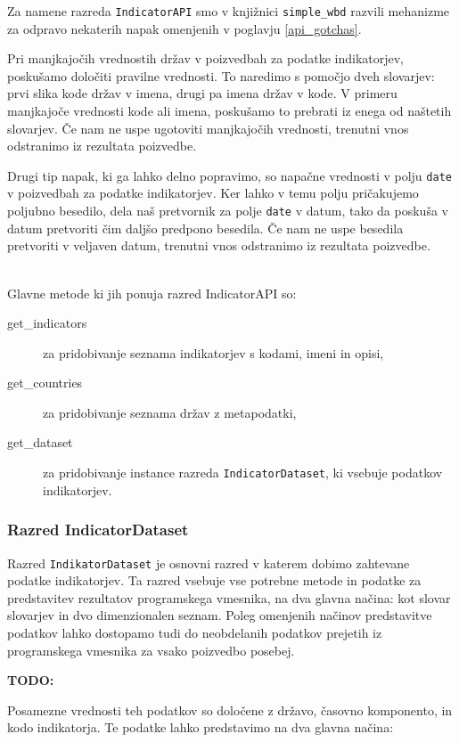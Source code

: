 Za namene razreda \verb|IndicatorAPI| smo v knjižnici \verb|simple_wbd|
razvili mehanizme za odpravo nekaterih napak omenjenih v poglavju 
\ref{api_gotchas}.

Pri manjkajočih vrednostih držav v poizvedbah za podatke indikatorjev,
poskušamo določiti pravilne vrednosti. To naredimo s pomočjo dveh
slovarjev: prvi slika kode držav v imena, drugi pa imena držav v kode. V
primeru manjkajoče vrednosti kode ali imena, poskušamo to prebrati iz enega
od naštetih slovarjev. Če nam ne uspe ugotoviti manjkajočih vrednosti,
trenutni vnos odstranimo iz rezultata poizvedbe.

Drugi tip napak, ki ga lahko delno popravimo, so napačne vrednosti v polju
\verb|date| v poizvedbah za podatke indikatorjev. Ker lahko v temu polju
pričakujemo poljubno besedilo, dela naš pretvornik za polje \verb|date| v 
datum, tako da poskuša v datum pretvoriti čim daljšo predpono besedila.
Če nam ne uspe besedila pretvoriti v veljaven datum, trenutni vnos odstranimo
iz rezultata poizvedbe.


\ \\
Glavne metode ki jih ponuja razred IndicatorAPI so:

\begin{description}  
\item [get\_indicators] za pridobivanje seznama indikatorjev s kodami, imeni
      in opisi,
\item [get\_countries] za pridobivanje seznama držav z metapodatki,
\item [get\_dataset] za pridobivanje instance razreda \verb|IndicatorDataset|,
      ki vsebuje podatkov indikatorjev.
\end{description}


\subsubsection{Razred IndicatorDataset}

Razred \verb|IndikatorDataset| je osnovni razred v katerem dobimo zahtevane podatke
indikatorjev. Ta razred vsebuje vse potrebne metode in podatke za predstavitev
rezultatov programskega vmesnika, na dva glavna načina: kot slovar slovarjev in
dvo dimenzionalen seznam. Poleg omenjenih načinov predstavitve podatkov lahko
dostopamo tudi do neobdelanih podatkov prejetih iz programskega vmesnika za
vsako poizvedbo posebej.

\textbf{TODO:}

Posamezne vrednosti teh podatkov so določene z državo, časovno komponento, in
kodo indikatorja. Te podatke lahko predstavimo na dva glavna načina:

